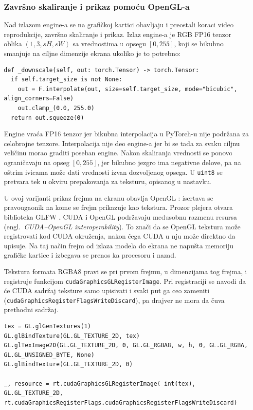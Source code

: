 \documentclass[12pt,a4paper]{article}
\begin{document}
\subsubsection{Završno skaliranje i prikaz pomoću OpenGL-a}
\label{sec:gpu_skaliranje}
\label{sec:gpu_prikaz}

Nad izlazom engine-a se na grafičkoj kartici obavljaju i preostali koraci video reprodukcije, završno skaliranje i prikaz. Izlaz engine-a je RGB FP16 tenzor oblika $(1,3,sH,sW)$ sa vrednostima u opsegu $[0,255]$, koji se bikubno smanjuje na ciljne dimenzije ekrana ukoliko je to potrebno:

\begin{verbatim}
def _downscale(self, out: torch.Tensor) -> torch.Tensor:
  if self.target_size is not None:
    out = F.interpolate(out, size=self.target_size, mode="bicubic", align_corners=False)
    out.clamp_(0.0, 255.0)
  return out.squeeze(0)
\end{verbatim}

Engine vraća FP16 tenzor jer bikubna interpolacija u PyTorch-u nije podržana za celobrojne tenzore. Interpolacija nije deo engine-a jer bi se tada za svaku ciljnu veličinu morao graditi poseban engine. Nakon skaliranja vrednosti se ponovo ograničavaju na opseg $[0,255]$, jer bikubno jezgro ima negativne delove, pa na oštrim ivicama može dati vrednosti izvan dozvoljenog opsega. U \texttt{uint8} se pretvara tek u okviru prepakovanja za teksturu, opisanog u nastavku.

U ovoj varijanti prikaz frejma na ekranu obavlja OpenGL \cite{OpenGL}: iscrtava se pravougaonik na kome se frejm prikazuje kao tekstura. Prozor plejera otvara biblioteka GLFW \cite{GLFW}. CUDA i OpenGL podržavaju međusobnu razmenu resursa (engl.\ \textit{CUDA--OpenGL interoperability}). To znači da se OpenGL tekstura može registrovati kod CUDA okruženja, nakon čega CUDA u nju može direktno da upisuje. Na taj način frejm od izlaza modela do ekrana ne napušta memoriju grafičke kartice i izbegava se prenos ka procesoru i nazad.

Tekstura formata RGBA8 pravi se pri prvom frejmu, u dimenzijama tog frejma, i registruje funkcijom \texttt{cudaGraphicsGLRegisterImage}. Pri registraciji se navodi da će CUDA sadržaj teksture samo upisivati i svaki put ga ceo zameniti (\texttt{cudaGraphicsRegisterFlagsWriteDiscard}), pa drajver ne mora da čuva prethodni sadržaj.

\begin{verbatim}
tex = GL.glGenTextures(1)
GL.glBindTexture(GL.GL_TEXTURE_2D, tex)
GL.glTexImage2D(GL.GL_TEXTURE_2D, 0, GL.GL_RGBA8, w, h, 0, GL.GL_RGBA, GL.GL_UNSIGNED_BYTE, None)
GL.glBindTexture(GL.GL_TEXTURE_2D, 0)

_, resource = rt.cudaGraphicsGLRegisterImage( int(tex), GL.GL_TEXTURE_2D, rt.cudaGraphicsRegisterFlags.cudaGraphicsRegisterFlagsWriteDiscard)
\end{verbatim}
\end{document}
